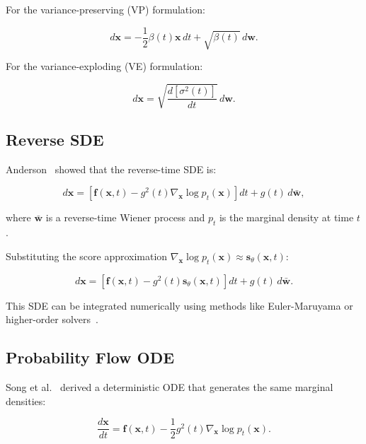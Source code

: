 \documentclass[12pt]{report}
\theoremstyle{definition}
\begin{document}
For the variance-preserving (VP) formulation:

\begin{equation}
d\mathbf{x} = -\frac{1}{2}\beta(t)\mathbf{x} \, dt + \sqrt{\beta(t)} \, d\mathbf{w}.
\label{eq:vp_sde}
\end{equation}

For the variance-exploding (VE) formulation:

\begin{equation}
d\mathbf{x} = \sqrt{\frac{d[\sigma^2(t)]}{dt}} \, d\mathbf{w}.
\label{eq:ve_sde}
\end{equation}

\subsection{Reverse SDE}

Anderson~\citep{anderson1982reverse} showed that the reverse-time SDE is:

\begin{equation}
d\mathbf{x} = \left[\mathbf{f}(\mathbf{x}, t) - g^2(t) \nabla_{\mathbf{x}} \log p_t(\mathbf{x})\right] dt + g(t) \, d\bar{\mathbf{w}},
\label{eq:reverse_sde}
\end{equation}

where $\bar{\mathbf{w}}$ is a reverse-time Wiener process and $p_t$ is the marginal density at time $t$.

Substituting the score approximation $\nabla_{\mathbf{x}} \log p_t(\mathbf{x}) \approx \mathbf{s}_\theta(\mathbf{x}, t)$:

\begin{equation}
d\mathbf{x} = \left[\mathbf{f}(\mathbf{x}, t) - g^2(t) \mathbf{s}_\theta(\mathbf{x}, t)\right] dt + g(t) \, d\bar{\mathbf{w}}.
\label{eq:reverse_sde_learned}
\end{equation}

This SDE can be integrated numerically using methods like Euler-Maruyama or higher-order solvers~\citep{jolicoeur2021gotta}.

\subsection{Probability Flow ODE}

Song et al.~\citep{song2020score} derived a deterministic ODE that generates the same marginal densities:

\begin{equation}
\frac{d\mathbf{x}}{dt} = \mathbf{f}(\mathbf{x}, t) - \frac{1}{2}g^2(t) \nabla_{\mathbf{x}} \log p_t(\mathbf{x}).
\label{eq:prob_flow_ode}
\end{equation}
\end{document}
